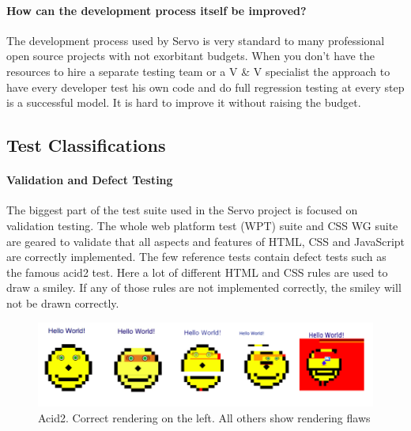 \documentclass{scrartcl}
\begin{document}
\paragraph{How can the development process itself be improved?}
The development process used by Servo is very standard to many professional open source projects with not exorbitant budgets. When you don't have the resources to hire a separate testing team or a V \& V specialist the approach to have every developer test his own code and do full regression testing at every step is a successful model. It is hard to improve it without raising the budget. 


\subsection{Test Classifications}

\paragraph{Validation and Defect Testing}
The biggest part of the test suite used in the Servo project is focused on validation testing. The whole web platform test (WPT) suite and CSS WG suite are geared to validate that all aspects and features of HTML, CSS and JavaScript are correctly implemented. The few reference tests contain defect tests such as the famous acid2 test. Here a lot of different HTML and CSS rules are used to draw a smiley. If any of those rules are not implemented correctly, the smiley will not be drawn correctly.

\begin{figure}[h]
    \centering
    \includegraphics[width=\textwidth]{acid2}
    \caption{Acid2. Correct rendering on the left. All others show rendering flaws}
\end{figure}
\end{document}
